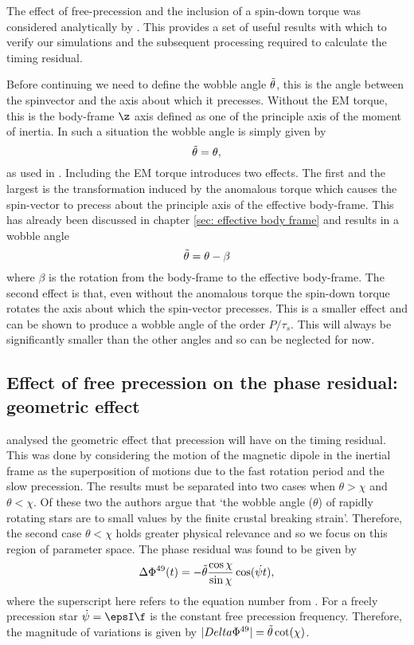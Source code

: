 \documentclass[/home/greg/Thesis/main/main.tex]{subfiles}
\begin{document}
The effect of free-precession and the inclusion of a spin-down torque was
considered analytically by \citet{Jones2001}. This provides a set of useful
results with which to verify our simulations and the subsequent processing
required to calculate the timing residual. 

Before continuing we need to define the wobble angle $\tilde{\theta}$, this is the angle
between the spinvector and the axis about which it precesses. Without the EM
torque, this is the body-frame $\z$ axis defined as one of the principle axis
of the moment of inertia. In such a situation the wobble angle is simply given
by 
\begin{equation}
    \tilde{\theta}=\theta,
\end{equation}
as used in \citet{Jones2001}. 
Including the EM torque introduces two effects. The
first and the largest is the transformation induced by the anomalous torque
which causes the spin-vector to precess about the principle axis of the
effective body-frame. This has already been discussed in chapter \ref{sec:
effective body frame} and results in a wobble angle
\begin{equation}
    \tilde{\theta} = \theta - \beta
\end{equation}
where $\beta$ is the rotation from the body-frame to the effective body-frame. 
The second effect is that, even without the anomalous torque the spin-down 
torque rotates the axis about which the spin-vector precesses. This is a smaller
effect and can be shown to produce a wobble angle of the order $P/\tau_{s}$. 
This will always be significantly smaller than the other angles and so can be
neglected for now.

\subsection{Effect of free precession on the phase residual: geometric effect}
\citet{Jones2001} analysed the geometric effect that precession will have on
the timing residual. This was done by considering the motion of the magnetic
dipole in the inertial frame as the superposition of motions due to the fast
rotation period and the slow precession. The results
must be separated into two cases when $\theta > \chi$ and $\theta < \chi$. Of
these two the authors argue that `the wobble angle ($\theta$) of rapidly rotating
stars are to small values by the finite crustal breaking strain'. Therefore, 
the second case $\theta < \chi$ holds greater physical relevance and so we 
focus on this region of parameter space. The phase residual was found to be 
given by  
\begin{equation}
    \Delta\Phi^{49}(t) = -\tilde{\theta} \frac{\cos\chi}{\sin\chi}\cos(\dot{\psi t}),
    \label{eqn: Jones 49}
\end{equation}
where the superscript here refers to the equation number from \citet{Jones2001}.
For a freely precession star $\dot{\psi}=\epsI \f$ is the constant free
precession frequency. Therefore, the magnitude of variations is given by 
$|Delta\Phi^{49}|=\tilde{\theta} \cot(\chi)$. 
\end{document}
